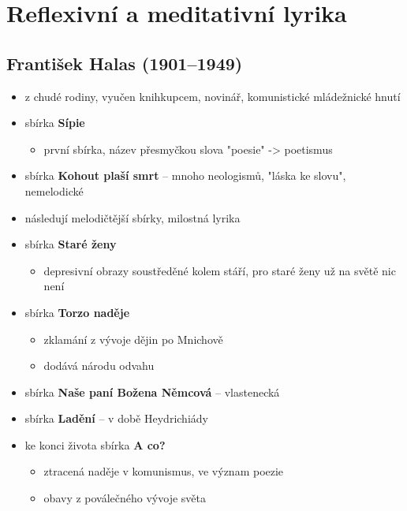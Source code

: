 \section{Reflexivní a meditativní lyrika}
\subsection{František Halas (1901--1949)}
\begin{itemize}
\item z chudé rodiny, vyučen knihkupcem, novinář, komunistické mládežnické hnutí
\item sbírka \textbf{Sípie} 
	\begin{itemize}
	\item první sbírka, název přesmyčkou slova "poesie" -> poetismus
	\end{itemize}
\item sbírka \textbf{Kohout plaší smrt} -- mnoho neologismů, "láska ke slovu", nemelodické
\item následují melodičtější sbírky, milostná lyrika
\item sbírka \textbf{Staré ženy}
	\begin{itemize}
	\item depresivní obrazy soustředěné kolem stáří, pro staré ženy už na světě nic není
	\end{itemize}
\item sbírka \textbf{Torzo naděje}	
	\begin{itemize}
	\item zklamání z vývoje dějin po Mnichově
	\item dodává národu odvahu
	\end{itemize}
\item sbírka \textbf{Naše paní Božena Němcová} -- vlastenecká
\item sbírka \textbf{Ladění} -- v době Heydrichiády
\item ke konci života sbírka \textbf{A co?}
	\begin{itemize}
	\item ztracená naděje v komunismus, ve význam poezie
	\item obavy z poválečného vývoje světa
	\end{itemize}
\end{itemize}

